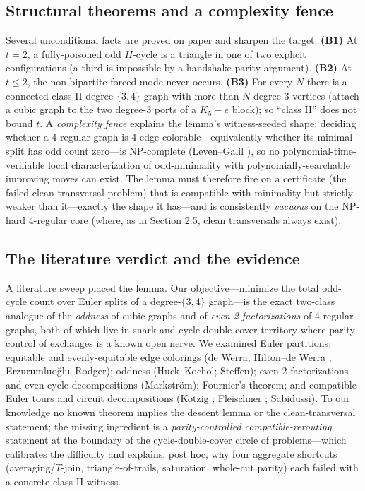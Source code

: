 \documentclass[11pt]{article}
\theoremstyle{definition}
\theoremstyle{remark}
\begin{document}
\subsection{Structural theorems and a complexity fence}\label{54-strikeb}

Several unconditional facts are proved on paper and sharpen the target. \textbf{(B1)} At $t=2$, a fully-poisoned odd $H$-cycle is a triangle in one of two explicit configurations (a third is impossible by a handshake parity argument). \textbf{(B2)} At $t \le 2$, the non-bipartite-forced mode never occurs. \textbf{(B3)} For every $N$ there is a connected class-II degree-$\{3,4\}$ graph with more than $N$ degree-3 vertices (attach a cubic graph to the two degree-3 ports of a $K_5{-}e$ block); so ``class II'' does not bound $t$. A \emph{complexity fence} explains the lemma's witness-seeded shape: deciding whether a 4-regular graph is 4-edge-colorable---equivalently whether its minimal split has odd count zero---is NP-complete (Leven--Galil \cite{LG}), so no polynomial-time-verifiable local characterization of odd-minimality with polynomially-searchable improving moves can exist. The lemma must therefore fire on a certificate (the failed clean-transversal problem) that is compatible with minimality but strictly weaker than it---exactly the shape it has---and is consistently \emph{vacuous} on the NP-hard 4-regular core (where, as in Section 2.5, clean transversals always exist).

\subsection{The literature verdict and the evidence}\label{55-evidence}

A literature sweep placed the lemma. Our objective---minimize the total odd-cycle count over Euler splits of a degree-$\{3,4\}$ graph---is the exact two-class analogue of the \emph{oddness} of cubic graphs and of \emph{even 2-factorizations} of 4-regular graphs, both of which live in snark and cycle-double-cover territory where parity control of exchanges is a known open nerve. We examined Euler partitions; equitable and evenly-equitable edge colorings (de Werra; Hilton--de Werra \cite{HdW}; Erzurumluoğlu--Rodger); oddness (Huck--Kochol; Steffen); even 2-factorizations and even cycle decompositions (Markström); Fournier's theorem; and compatible Euler tours and circuit decompositions (Kotzig \cite{Kot}; Fleischner \cite{Fle}; Sabidussi). To our knowledge no known theorem implies the descent lemma or the clean-transversal statement; the missing ingredient is a \emph{parity-controlled compatible-rerouting} statement at the boundary of the cycle-double-cover circle of problems---which calibrates the difficulty and explains, post hoc, why four aggregate shortcuts (averaging/$T$-join, triangle-of-trails, saturation, whole-cut parity) each failed with a concrete class-II witness.
\end{document}
